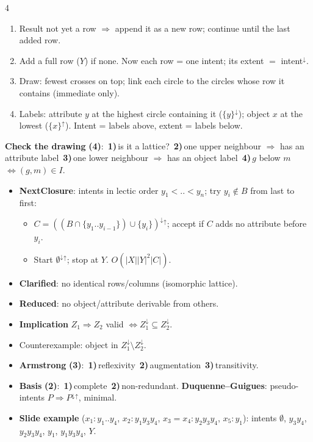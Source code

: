 \documentclass[10pt]{article}
\newcommand{\kw}[1]{\textbf{#1}}
\newcommand{\cnt}[1]{{\color{h2}\bfseries(#1)}}
\newcommand{\n}[1]{\,{\color{h2}\bfseries#1)}\,}
\newcommand{\up}{^{\uparrow}}
\newcommand{\dn}{^{\downarrow}}
\begin{document}
\begin{multicols*}{4}
\begin{enumerate}[leftmargin=8pt]
\item Result not yet a row $\Rightarrow$ append it as a new row; continue until the last added row.
\item Add a full row ($Y$) if none. Now each row = one intent; its extent $=$ intent$\dn$.
\item Draw: fewest crosses on top; link each circle to the circles whose row it contains (immediate only).
\item Labels: attribute $y$ at the highest circle containing it ($\{y\}\dn$); object $x$ at the lowest ($\{x\}\up$). Intent = labels above, extent = labels below.
\end{enumerate}
\par\textbf{Check the drawing} \cnt{4}: \n1is it a lattice? \n2one upper neighbour $\Rightarrow$ has an attribute label \n3one lower neighbour $\Rightarrow$ has an object label \n4$g$ below $m$ $\iff(g,m)\in I$.
\begin{itemize}
\item \kw{NextClosure}: intents in lectic order $y_1<..<y_n$; try $y_i\notin B$ from last to first:
\begin{itemize}
\item $C=((B\cap\{y_1..y_{i-1}\})\cup\{y_i\})\dn{}\up$; accept if $C$ adds no attribute before $y_i$.
\item Start $\emptyset\dn{}\up$; stop at $Y$. $O(|X||Y|^2|C|)$.
\end{itemize}
\item \kw{Clarified}: no identical rows/columns (isomorphic lattice).
\item \kw{Reduced}: no object/attribute derivable from others.
\item \kw{Implication} $Z_1\Rightarrow Z_2$ valid $\iff Z_1\dn\subseteq Z_2\dn$.
\item Counterexample: object in $Z_1\dn\setminus Z_2\dn$.
%
\item \kw{Armstrong} \cnt{3}: \n1reflexivity \n2augmentation \n3transitivity.
\item \kw{Basis} \cnt{2}: \n1complete \n2non-redundant. \kw{Duquenne--Guigues}: pseudo-intents $P\Rightarrow P\dn{}\up$, minimal.
\end{itemize}
\begin{itemize}
\item \kw{Slide example} ($x_1{:}y_1..y_4$, $x_2{:}y_1y_3y_4$, $x_3{=}x_4{:}y_2y_3y_4$, $x_5{:}y_1$): intents $\emptyset$, $y_3y_4$, $y_2y_3y_4$, $y_1$, $y_1y_3y_4$, $Y$.
\end{itemize}


\end{multicols*}
\end{document}
